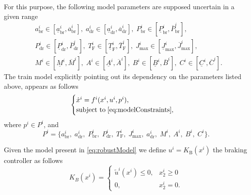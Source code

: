 For this purpose, the following model parameters are supposed uncertain in a given range
%
\begin{subequations}
	\begin{align*}
		&a_{\mathrm{br}}^i \in [\underline{a}_{\mathrm{br}}^i , \overline{a}_{\mathrm{br}}^i], \;
		a_{\mathrm{dr}}^i \in [\underline{a}_{\mathrm{dr}}^i , \overline{a}_{\mathrm{dr}}^i],  \;
		P^i_{\mathrm{br}} \in [\underline{P}_{\mathrm{br}}^i , \overline{P}_{\mathrm{br}}^i]  , \\
		&P^i_{\mathrm{dr}} \in [\underline{P}_{\mathrm{dr}}^i , \overline{P}_{\mathrm{dr}}^i],   \;
		T_\mathrm{F}^i \in [\underline{T}_\mathrm{F}^i , \overline{T}_\mathrm{F}^i] ,  \;
		J_\mathrm{max}^i \in [\underline{J}_\mathrm{max}^i , \overline{J}_\mathrm{max}^i] , \\
		&M^i \in [\underline{M}^i , \overline{M}^i], \;
		A^i \in [\underline{A}^i , \overline{A}^i] ,  \;
		B^i \in [\underline{B}^i , \overline{B}^i] , \;
		C^i \in [\underline{C}^i , \overline{C}^i].
	\end{align*}
\end{subequations}
%
The train model explicitly pointing out its dependency on the parameters listed above, appears as follows
%
\begin{equation}   \label{eq:robustModel}  
	\begin{cases}
		\dot{x}^i = f^i(x^i,u^i,p^i),  \\ 
		\text{subject to} \; \eqref{eq:modelConstraints} ,
	\end{cases}
\end{equation}
where $p^i \in P^i$, and
\begin{equation*}
	P^i = \{a_{\mathrm{br}}^i,\;  a_{\mathrm{dr}}^i,\;P^i_{\mathrm{br}},\;P^i_{\mathrm{dr}},\;T_\mathrm{F}^i,\;  J_\mathrm{max}^i,\;a_{\mathrm{dr}}^i,\;M^i,\;A^i ,\; B^i, \; C^i \}.
\end{equation*}

\begin{definition} \label{def:brakingController}
	Given the model present in \eqref{eq:robustModel} we define  $u^i= K_\mathrm{B}(x^i)$ the braking controller as follows
	\begin{equation*}
		K_B(x^i)=
		\begin{cases}
			\tilde{u}^i(x^i) \leq 0,& x_2^i \geq 0\\
			0 ,& x_2^i = 0.
		\end{cases}     
	\end{equation*}
\end{definition}



